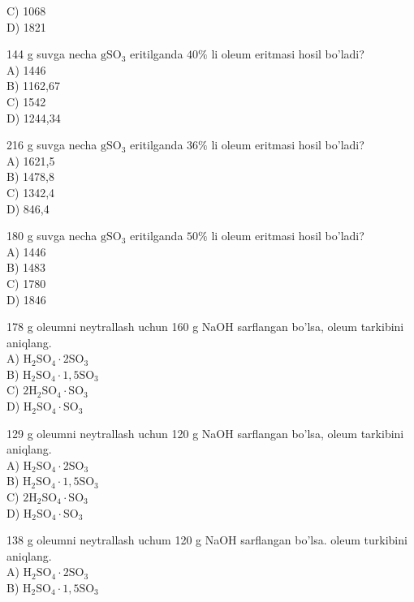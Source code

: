 C) 1068\\
D) 1821
  \item 144 g suvga necha $\mathrm{g} \mathrm{SO}_{3}$ eritilganda $40 \%$ li oleum eritmasi hosil bo'ladi?\\
A) 1446\\
B) 1162,67\\
C) 1542\\
D) 1244,34
  \item 216 g suvga necha $\mathrm{g} \mathrm{SO}_{3}$ eritilganda $36 \%$ li oleum eritmasi hosil bo'ladi?\\
A) 1621,5\\
B) 1478,8\\
C) 1342,4\\
D) 846,4
  \item 180 g suvga necha $\mathrm{g} \mathrm{SO}_{3}$ eritilganda $50 \%$ li oleum eritmasi hosil bo'ladi?\\
A) 1446\\
B) 1483\\
C) 1780\\
D) 1846
  \item 178 g oleumni neytrallash uchun 160 g NaOH sarflangan bo'lsa, oleum tarkibini aniqlang.\\
A) $\mathrm{H}_{2} \mathrm{SO}_{4} \cdot 2 \mathrm{SO}_{3}$\\
B) $\mathrm{H}_{2} \mathrm{SO}_{4} \cdot 1,5 \mathrm{SO}_{3}$\\
C) $2 \mathrm{H}_{2} \mathrm{SO}_{4} \cdot \mathrm{SO}_{3}$\\
D) $\mathrm{H}_{2} \mathrm{SO}_{4} \cdot \mathrm{SO}_{3}$\\
  \item 129 g oleumni neytrallash uchun 120 g NaOH sarflangan bo'lsa, oleum tarkibini aniqlang.\\
A) $\mathrm{H}_{2} \mathrm{SO}_{4} \cdot 2 \mathrm{SO}_{3}$\\
B) $\mathrm{H}_{2} \mathrm{SO}_{4} \cdot 1,5 \mathrm{SO}_{3}$\\
C) $2 \mathrm{H}_{2} \mathrm{SO}_{4} \cdot \mathrm{SO}_{3}$\\
D) $\mathrm{H}_{2} \mathrm{SO}_{4} \cdot \mathrm{SO}_{3}$
  \item 138 g oleumni neytrallash uchum 120 g NaOH sarflangan bo'lsa. oleum turkibini aniqlang.\\
A) $\mathrm{H}_{2} \mathrm{SO}_{4} \cdot 2 \mathrm{SO}_{3}$\\
B) $\mathrm{H}_{2} \mathrm{SO}_{4} \cdot 1,5 \mathrm{SO}_{3}$\\
